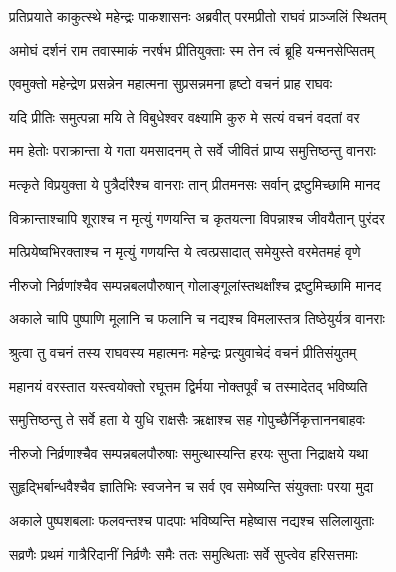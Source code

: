 
\twolineshloka
{प्रतिप्रयाते काकुत्स्थे महेन्द्रः पाकशासनः}
{अब्रवीत् परमप्रीतो राघवं प्राञ्जलिं स्थितम्} %

\twolineshloka
{अमोघं दर्शनं राम तवास्माकं नरर्षभ}
{प्रीतियुक्ताः स्म तेन त्वं ब्रूहि यन्मनसेप्सितम्} %

\twolineshloka
{एवमुक्तो महेन्द्रेण प्रसन्नेन महात्मना}
{सुप्रसन्नमना हृष्टो वचनं प्राह राघवः} %

\twolineshloka
{यदि प्रीतिः समुत्पन्ना मयि ते विबुधेश्वर}
{वक्ष्यामि कुरु मे सत्यं वचनं वदतां वर} %

\twolineshloka
{मम हेतोः पराक्रान्ता ये गता यमसादनम्}
{ते सर्वे जीवितं प्राप्य समुत्तिष्ठन्तु वानराः} %

\twolineshloka
{मत्कृते विप्रयुक्ता ये पुत्रैर्दारैश्च वानराः}
{तान् प्रीतमनसः सर्वान् द्रष्टुमिच्छामि मानद} %

\twolineshloka
{विक्रान्ताश्चापि शूराश्च न मृत्युं गणयन्ति च}
{कृतयत्ना विपन्नाश्च जीवयैतान् पुरंदर} %

\twolineshloka
{मत्प्रियेष्वभिरक्ताश्च न मृत्युं गणयन्ति ये}
{त्वत्प्रसादात् समेयुस्ते वरमेतमहं वृणे} %

\twolineshloka
{नीरुजो निर्व्रणांश्चैव सम्पन्नबलपौरुषान्}
{गोलाङ्गूलांस्तथर्क्षांश्च द्रष्टुमिच्छामि मानद} %

\twolineshloka
{अकाले चापि पुष्पाणि मूलानि च फलानि च}
{नद्यश्च विमलास्तत्र तिष्ठेयुर्यत्र वानराः} %

\twolineshloka
{श्रुत्वा तु वचनं तस्य राघवस्य महात्मनः}
{महेन्द्रः प्रत्युवाचेदं वचनं प्रीतिसंयुतम्} %

\twolineshloka
{महानयं वरस्तात यस्त्वयोक्तो रघूत्तम}
{द्विर्मया नोक्तपूर्वं च तस्मादेतद् भविष्यति} %

\twolineshloka
{समुत्तिष्ठन्तु ते सर्वे हता ये युधि राक्षसैः}
{ऋक्षाश्च सह गोपुच्छैर्निकृत्ताननबाहवः} %

\twolineshloka
{नीरुजो निर्व्रणाश्चैव सम्पन्नबलपौरुषाः}
{समुत्थास्यन्ति हरयः सुप्ता निद्राक्षये यथा} %

\twolineshloka
{सुहृद्भिर्बान्धवैश्चैव ज्ञातिभिः स्वजनेन च}
{सर्व एव समेष्यन्ति संयुक्ताः परया मुदा} %

\twolineshloka
{अकाले पुष्पशबलाः फलवन्तश्च पादपाः}
{भविष्यन्ति महेष्वास नद्यश्च सलिलायुताः} %

\twolineshloka
{सव्रणैः प्रथमं गात्रैरिदानीं निर्व्रणैः समैः}
{ततः समुत्थिताः सर्वे सुप्त्वेव हरिसत्तमाः} %

